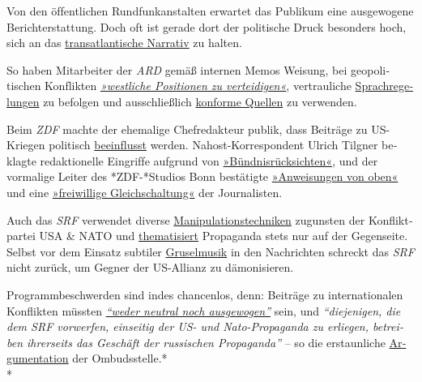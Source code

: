 Von den öf‌fentlichen Rund­funk­an­stalten er­war­tet das Pu­bli­kum
eine aus­ge­wogene Bericht­er­stattung. Doch of‌t ist ge­rade dort der
politische Druck be­sonders hoch, sich an das
\href{https://swprs.org/das-gewuenschte-narrativ/}{trans­at­lan­tische
Narra­tiv} zu halten.

So haben Mitarbeiter der \emph{ARD} gemäß internen Memos Weisung, bei
geo­po­li­tischen Kon­f‌lik­ten
\emph{\href{https://www.heise.de/tp/features/Ukraine-Konflikt-ARD-Programmbeirat-bestaetigt-Publikumskritik-3367400.html}{»west­liche
Posi­tionen zu ver­tei­di­gen«}}, ver­trau­liche
\href{https://www.heise.de/tp/features/Die-vertraulichen-Sprachregelungen-der-ARD-3758887.html}{Sprach­­re­­ge­lungen}
zu be­fol­gen und aus­­schließ­­lich
\href{https://www.oxmoxhh.de/magazin/story-interview/oxmox-exklusiv-interview-mit-volker-braeutigam-friedhelm-klinkhammer/}{konforme
Quellen} zu ver­wen­den.

Beim \emph{ZDF} machte der ehe­ma­lige Chef­re­dakteur publik, dass
Bei­träge zu US-Kriegen poli­tisch
\href{https://www.youtube.com/watch?v=i2423aDq_hE}{be­ein­f‌‌lusst}
werden. Nahost-Kor­res­pon­dent Ulrich Tilgner be­klagte
re­dak­tio­nelle Ein­grif‌fe aufgrund von
\href{http://www.berliner-zeitung.de/korrespondent-ulrich-tilgner-sucht-mehr-distanz-zum-zdf--ich-fuehle-mich-eingeschraenkt--15870684}{»Bünd­nis­rück­sich­ten«},
und der vormalige Leiter des *ZDF-*Studios Bonn be­stä­tig­te
\href{https://propagandaschau.wordpress.com/2016/01/30/wolfgang-herles-es-gibt-in-den-oeffentlich-rechtlichen-anweisungen-von-oben/}{»An­wei­sungen
von oben«} und eine
\href{http://www.rolandtichy.de/daili-es-sentials/meinungsfreiheit-anordnung-zur-anpassung/}{»frei­willige
Gleich­schal­tung«} der Jour­na­lis­ten.

Auch das \emph{SRF} verwendet diverse
\href{https://swprs.org/srf-propaganda-analyse/}{Mani­pu­lations­tech­niken}
zugunsten der Konflikt­partei USA \& NATO und
\href{http://www.srf.ch/sendungen/srfglobal/propagandagruesse-aus-moskau-2}{thematisiert}
Propaganda stets nur auf der Gegenseite. Selbst vor dem Einsatz
sub­tiler
\href{http://www.srf.ch/play/tv/10vor10/video/warum-assad-bleibt?id=a6d267c9-52b3-470b-868e-95bb919a0b96}{Grusel­musik}
in den Nach­rich­ten schreckt das \emph{SRF} nicht zurück, um Gegner der
US-Allianz zu dämo­ni­sieren.

Programmbe­schwer­den sind indes chan­cen­los, denn: Beiträge zu
inter­na­tio­nalen Kon­flik­ten müssten
\emph{\href{https://swprs.org/srf-ombudsstelle-im-faktencheck/}{``weder
neutral noch ausgewogen''}} sein, und \emph{``die­je­ni­gen, die dem SRF
vor­wer­fen, ein­sei­tig der US- und Nato-Pro­pa­gan­da zu er­lie­gen,
be­trei­ben ihrer­seits das Ge­schäf‌t der russischen Pro­pa­ganda''} --
so die erstaun­liche
\href{https://swprs.org/srf-ombudsstelle-im-faktencheck/}{Ar­gu­men­ta­tion}
der Om­buds­stelle.*\\
*

